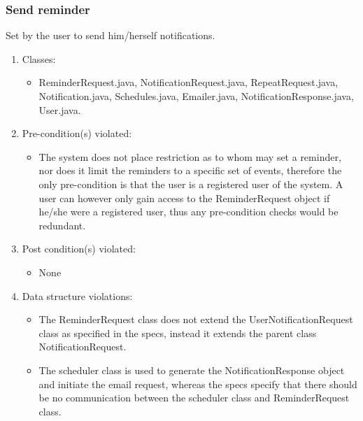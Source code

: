 \subsubsection*{Send reminder}
Set by the user to send him/herself notifications.
	\begin{enumerate}
		\item Classes: 
			\begin{itemize}
				\item ReminderRequest.java, NotificationRequest.java, RepeatRequest.java, Notification.java, Schedules.java, 							Emailer.java, NotificationResponse.java, User.java.
			\end{itemize}
		\item Pre-condition(s) violated:
			\begin{itemize}
				\item The system does not place restriction as to whom may set a reminder, nor does it limit the reminders to a 						specific set of events, therefore the only pre-condition is that the user is a registered user of the system. 					A user can however only gain access to the ReminderRequest object if he/she were a registered user, thus any 						pre-condition checks would be redundant.
			\end{itemize}
		\item Post condition(s) violated:
			\begin{itemize}
				\item None 
			\end{itemize}
		\item Data structure violations:
			\begin{itemize}
				\item The ReminderRequest class does not extend the UserNotificationRequest class as specified in the specs, 							instead it extends the parent class NotificationRequest.
				\item The scheduler class is used to generate the NotificationResponse object and initiate the email request, 							whereas the specs specify that there should be no communication between the scheduler class and 									ReminderRequest class.
			\end{itemize}
\end{enumerate}
\newpage


